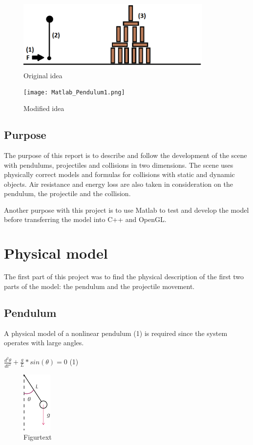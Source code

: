 \documentclass[a4paper,12pt,twoside,english]{article}
\begin{document}
\begin{figure}[h]
\includegraphics[height=3.5cm]{ideasketch.png}
\centering
\caption{Original idea}
\end{figure}
\begin{figure}[h]
\texttt{[image: Matlab\_Pendulum1.png]}
\centering
\caption{Modified idea}
\end{figure} 



\subsection{Purpose}
The purpose of this report is to describe and follow the development of the scene with pendulums, projectiles and collisions in two dimensions. The scene uses physically correct models and formulas for collisions with static and dynamic objects. Air resistance and energy loss are also taken in consideration on the pendulum, the projectile and the collision.

Another purpose with this project is to use Matlab to test and develop the model before transferring the model into C++ and OpenGL. 

\section{Physical model}
The first part of this project was to find the physical description of the first two parts of the model: the pendulum and the projectile movement. 
\subsection{Pendulum}
A physical model of a nonlinear pendulum (1) is required since the system operates with large angles. \\ \\
$\frac{d^2\theta}{dt^2} + \frac{g}{L}*sin(\theta) = 0$ \hfill (1) \\ 

\begin{figure}[h]
\centering
\includegraphics[height=3cm]{pendulum_2.png}
\caption{Figurtext}
\end{figure}
\end{document}
